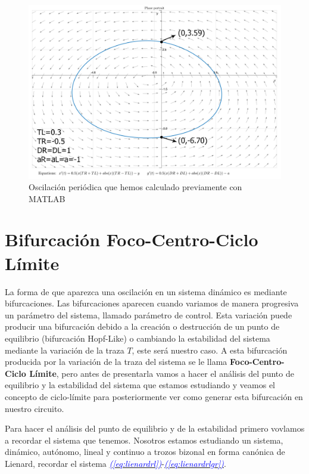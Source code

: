 \documentclass[12pt,a4paper]{report} %
\newcommand{\eref}[1]{\hyperref[#1]{\textcolor{blue}{\textit{(\ref*{#1})}}}}
\begin{document}
	\begin{figure}[h]
		\centering
		\includegraphics[width=1\textwidth]{clejemplo.jpg}
		\caption{Oscilación periódica que hemos calculado previamente con MATLAB}
		\label{fig:clejemplo}
	\end{figure}\smallskip
	
	\newpage
	
	\chapter{Bifurcación Foco-Centro-Ciclo Límite}
	La forma de que aparezca una oscilación en un sistema dinámico es mediante bifurcaciones. Las bifurcaciones aparecen cuando variamos de manera progresiva un parámetro del sistema, llamado parámetro de control. Esta variación puede producir una bifurcación debido a la creación o destrucción de un punto de equilibrio (bifurcación Hopf-Like) o cambiando la estabilidad del sistema mediante la variación de la traza $T$, este será nuestro caso. A esta bifurcación producida por la variación de la traza del sistema se le llama \textbf{Foco-Centro-Ciclo Límite}, pero antes de presentarla vamos a hacer el análisis del punto de equilibrio y la estabilidad del sistema que estamos estudiando y veamos el concepto de ciclo-límite para posteriormente ver como generar esta bifurcación en nuestro circuito.
	
		\vspace{0.5cm}Para hacer el análisis del punto de equilibrio y de la estabilidad primero vovlamos a recordar el sistema que tenemos. Nosotros estamos estudiando un sistema, dinámico, autónomo, lineal y continuo a trozos bizonal en forma canónica de Lienard, recordar el sistema \eref{eq:lienardrl}-\eref{eq:lienardrlgr}.
		
\end{document}
